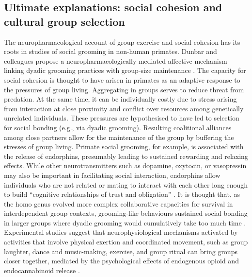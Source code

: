 
\subsection{Ultimate explanations: social cohesion and cultural group selection}
The neuropharmacological account of group exercise and social cohesion has its roots in studies of social grooming in non-human primates.  Dunbar and colleagues propose a neuropharmacologically mediated affective mechanism linking dyadic grooming practices with group-size maintenance \citep{Machin2011}.  The capacity for social cohesion is thought to have arisen in primates as an adaptive response to the pressures of group living.  Aggregating in groups serves to reduce threat from predation.  At the same time, it can be individually costly due to stress arising from interaction at close proximity and conflict over resources among genetically unrelated individuals.  These pressures are hypothesised to have led to selection for social bonding (e.g., via dyadic grooming). Resulting coalitional alliances among close partners allow for the maintenance of the group by buffering the stresses of group living.  Primate social grooming, for example, is associated with the release of endorphins, presumably leading to sustained rewarding and relaxing effects.  While other neurotransmitters such as dopamine, oxytocin, or vasopressin may also be important in facilitating social interaction, endorphins allow individuals who are not related or mating to interact with each other long enough to build ``cognitive relationships of trust and obligation'' \citep[1839]{Dunbar2012}.  It is thought that, as the homo genus evolved more complex collaborative capacities for survival in interdependent group contexts, grooming-like behaviours sustained social bonding in larger groups where dyadic grooming would cumulatively take too much time \citep{Dunbar2012}.  Experimental studies suggest that neurophysiological mechanisms activated by activities that involve physical exertion and coordinated movement, such as group laughter, dance and music-making, exercise, and group ritual can bring groups closer together, mediated by the psychological effects of endogenous opioid and endocannabinoid release \citep{Cohen2009,Fischer2014a,Fischer2014,Sullivan2014,Tarr2016,Tarr2015}.

